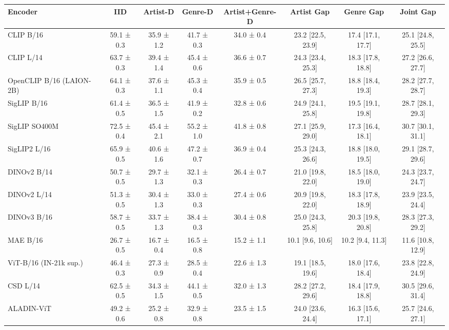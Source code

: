 \begin{tabular}{lccccccc}
\toprule
Encoder & IID & Artist-D & Genre-D & Artist+Genre-D & Artist Gap & Genre Gap & Joint Gap \\
\midrule
CLIP B/16 & 59.1 ± 0.3 & 35.9 ± 1.2 & 41.7 ± 0.3 & 34.0 ± 0.4 & 23.2 [22.5, 23.9] & 17.4 [17.1, 17.7] & 25.1 [24.8, 25.5] \\
CLIP L/14 & 63.7 ± 0.3 & 39.4 ± 1.4 & 45.4 ± 0.6 & 36.6 ± 0.7 & 24.3 [23.4, 25.3] & 18.3 [17.8, 18.8] & 27.2 [26.6, 27.7] \\
OpenCLIP B/16 (LAION-2B) & 64.1 ± 0.3 & 37.6 ± 1.1 & 45.3 ± 0.4 & 35.9 ± 0.5 & 26.5 [25.7, 27.3] & 18.8 [18.4, 19.3] & 28.2 [27.7, 28.7] \\
SigLIP B/16 & 61.4 ± 0.5 & 36.5 ± 1.5 & 41.9 ± 0.2 & 32.8 ± 0.6 & 24.9 [24.1, 25.8] & 19.5 [19.1, 19.8] & 28.7 [28.1, 29.3] \\
SigLIP SO400M & 72.5 ± 0.4 & 45.4 ± 2.1 & 55.2 ± 1.0 & 41.8 ± 0.8 & 27.1 [25.9, 29.0] & 17.3 [16.4, 18.1] & 30.7 [30.1, 31.1] \\
SigLIP2 L/16 & 65.9 ± 0.5 & 40.6 ± 1.6 & 47.2 ± 0.7 & 36.9 ± 0.4 & 25.3 [24.3, 26.6] & 18.8 [18.0, 19.5] & 29.1 [28.7, 29.6] \\
DINOv2 B/14 & 50.7 ± 0.5 & 29.7 ± 1.3 & 32.1 ± 0.3 & 26.4 ± 0.7 & 21.0 [19.8, 22.0] & 18.5 [18.0, 19.0] & 24.3 [23.7, 24.7] \\
DINOv2 L/14 & 51.3 ± 0.5 & 30.4 ± 1.3 & 33.0 ± 0.3 & 27.4 ± 0.6 & 20.9 [19.8, 22.0] & 18.3 [17.8, 18.9] & 23.9 [23.5, 24.4] \\
DINOv3 B/16 & 58.7 ± 0.5 & 33.7 ± 1.3 & 38.4 ± 0.3 & 30.4 ± 0.8 & 25.0 [24.3, 25.8] & 20.3 [19.8, 20.8] & 28.3 [27.3, 29.2] \\
MAE B/16 & 26.7 ± 0.5 & 16.7 ± 0.4 & 16.5 ± 0.8 & 15.2 ± 1.1 & 10.1 [9.6, 10.6] & 10.2 [9.4, 11.3] & 11.6 [10.8, 12.9] \\
ViT-B/16 (IN-21k sup.) & 46.4 ± 0.3 & 27.3 ± 0.9 & 28.5 ± 0.4 & 22.6 ± 1.3 & 19.1 [18.5, 19.6] & 18.0 [17.6, 18.4] & 23.8 [22.8, 24.9] \\
CSD L/14 & 62.5 ± 0.5 & 34.3 ± 1.5 & 44.1 ± 0.5 & 32.0 ± 1.3 & 28.2 [27.2, 29.6] & 18.4 [17.9, 18.8] & 30.5 [29.6, 31.4] \\
ALADIN-ViT & 49.2 ± 0.6 & 25.2 ± 0.8 & 32.9 ± 0.8 & 23.5 ± 1.5 & 24.0 [23.6, 24.4] & 16.3 [15.6, 17.1] & 25.7 [24.6, 27.1] \\
\bottomrule
\end{tabular}
